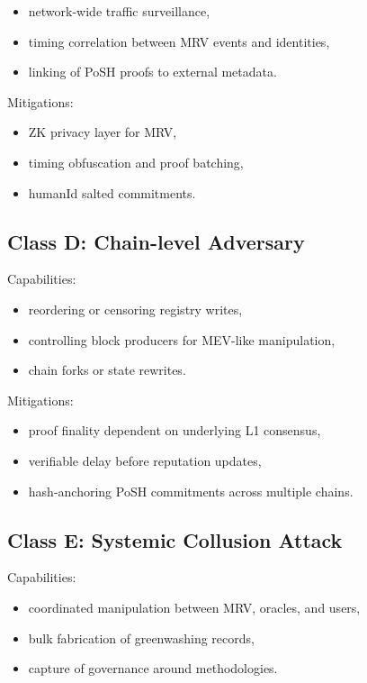 \documentclass[11pt,a4paper]{report}
\theoremstyle{definition}
\theoremstyle{remark}
\begin{document}
\begin{itemize}[leftmargin=*]
  \item network-wide traffic surveillance,
  \item timing correlation between MRV events and identities,
  \item linking of PoSH proofs to external metadata.
\end{itemize}

Mitigations:
\begin{itemize}[leftmargin=*]
  \item ZK privacy layer for MRV,
  \item timing obfuscation and proof batching,
  \item humanId salted commitments.
\end{itemize}

\subsection{Class D: Chain-level Adversary}
Capabilities:

\begin{itemize}[leftmargin=*]
  \item reordering or censoring registry writes,
  \item controlling block producers for MEV-like manipulation,
  \item chain forks or state rewrites.
\end{itemize}

Mitigations:
\begin{itemize}[leftmargin=*]
  \item proof finality dependent on underlying L1 consensus,
  \item verifiable delay before reputation updates,
  \item hash-anchoring PoSH commitments across multiple chains.
\end{itemize}

\subsection{Class E: Systemic Collusion Attack}
Capabilities:

\begin{itemize}[leftmargin=*]
  \item coordinated manipulation between MRV, oracles, and users,
  \item bulk fabrication of greenwashing records,
  \item capture of governance around methodologies.
\end{itemize}
\end{document}
